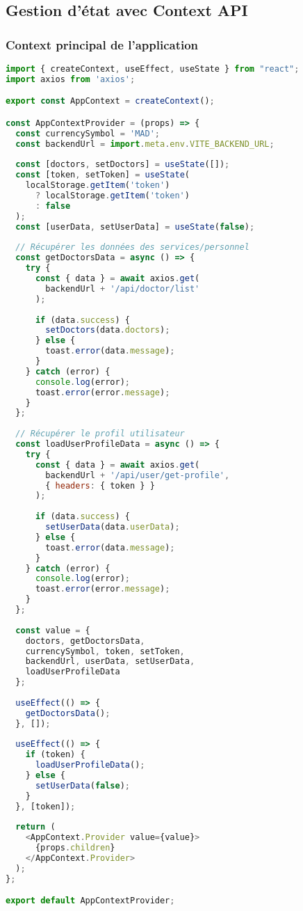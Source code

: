 \subsection{Gestion d'état avec Context API}

\subsubsection{Context principal de l'application}

\begin{lstlisting}[language=JavaScript, caption=AppContext.jsx]
import { createContext, useEffect, useState } from "react";
import axios from 'axios';

export const AppContext = createContext();

const AppContextProvider = (props) => {
  const currencySymbol = 'MAD';
  const backendUrl = import.meta.env.VITE_BACKEND_URL;
  
  const [doctors, setDoctors] = useState([]);
  const [token, setToken] = useState(
    localStorage.getItem('token') 
      ? localStorage.getItem('token') 
      : false
  );
  const [userData, setUserData] = useState(false);
  
  // Récupérer les données des services/personnel
  const getDoctorsData = async () => {
    try {
      const { data } = await axios.get(
        backendUrl + '/api/doctor/list'
      );
      
      if (data.success) {
        setDoctors(data.doctors);
      } else {
        toast.error(data.message);
      }
    } catch (error) {
      console.log(error);
      toast.error(error.message);
    }
  };
  
  // Récupérer le profil utilisateur
  const loadUserProfileData = async () => {
    try {
      const { data } = await axios.get(
        backendUrl + '/api/user/get-profile',
        { headers: { token } }
      );
      
      if (data.success) {
        setUserData(data.userData);
      } else {
        toast.error(data.message);
      }
    } catch (error) {
      console.log(error);
      toast.error(error.message);
    }
  };
  
  const value = {
    doctors, getDoctorsData,
    currencySymbol, token, setToken,
    backendUrl, userData, setUserData,
    loadUserProfileData
  };
  
  useEffect(() => {
    getDoctorsData();
  }, []);
  
  useEffect(() => {
    if (token) {
      loadUserProfileData();
    } else {
      setUserData(false);
    }
  }, [token]);
  
  return (
    <AppContext.Provider value={value}>
      {props.children}
    </AppContext.Provider>
  );
};

export default AppContextProvider;
\end{lstlisting}


